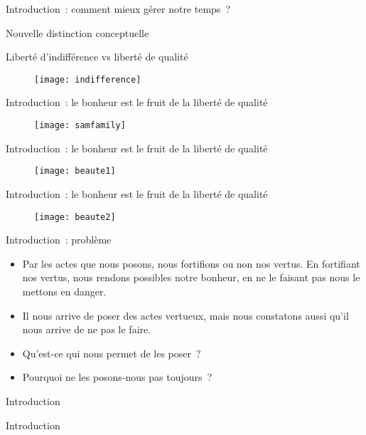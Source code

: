 \documentclass[11pt,xcolor=dvipsname,ignorenonframetext,handout]{beamer}
\begin{document}
\begin{frame}{Introduction~: comment mieux gérer notre temps~?}
\begin{frame}{Nouvelle distinction conceptuelle}
\end{frame}
\begin{frame}{Liberté d'indifférence vs liberté de qualité}
    {
        \begin{figure}
          \centering
          \texttt{[image: indifference]}
        \end{figure}
          }    
\end{frame}
\begin{frame}{Introduction~: le bonheur est le fruit de la liberté de qualité}
    {
        \begin{figure}
          \centering
          \texttt{[image: samfamily]}
        \end{figure}
          }    
\end{frame}
\begin{frame}{Introduction~: le bonheur est le fruit de la liberté de qualité}
    {
        \begin{figure}
          \centering
          \texttt{[image: beaute1]}
        \end{figure}
          }    
\end{frame}
\begin{frame}{Introduction~: le bonheur est le fruit de la liberté de qualité}
    {
        \begin{figure}
          \centering
          \texttt{[image: beaute2]}
        \end{figure}
          }    
\end{frame}
\begin{frame}{Introduction~: problème}
    \begin{itemize}
        \rightskip=0pt\leftskip=0pt
        \item Par les actes que nous posons, nous fortifions ou non nos vertus. En fortifiant nos vertus, nous rendons possibles notre bonheur, en ne le faisant pas nous le mettons en danger.
        \item Il nous arrive de poser des actes vertueux, mais nous constatons aussi qu'il nous arrive de ne pas le faire.
        \item Qu'est-ce qui nous permet de les poser~?
        \item Pourquoi ne les posons-nous pas toujours~?
    \end{itemize}
\end{frame}{Introduction}
\begin{frame}{Introduction}
    \begin{itemize}

\end{itemize}
\end{frame}
\end{frame}
\end{document}
